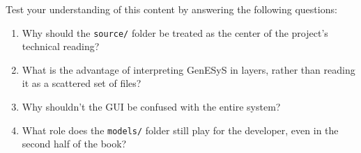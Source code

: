 Test your understanding of this content by answering the following questions:

\begin{enumerate}
 \item Why should the \texttt{source/} folder be treated as the center of the project's technical reading?

\item What is the advantage of interpreting GenESyS in layers, rather than reading it as a scattered set of files?

\item Why shouldn't the GUI be confused with the entire system?

\item What role does the \texttt{models/} folder still play for the developer, even in the second half of the book?
\end{enumerate}
